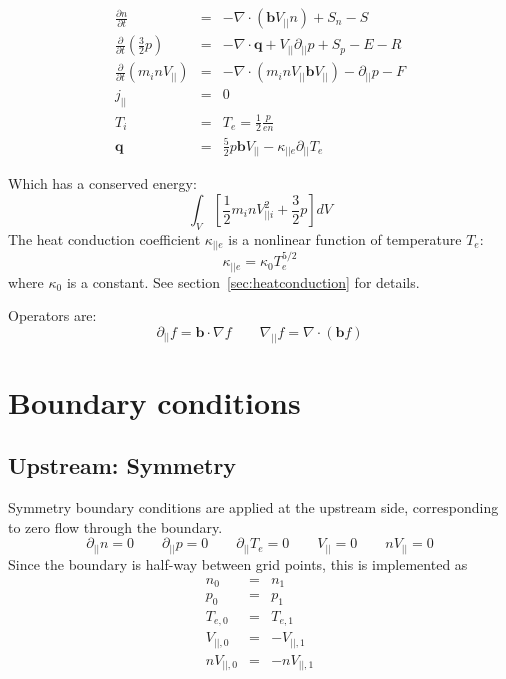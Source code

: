 \documentclass[12pt,a4paper]{article}
\newcommand{\bvec}{\mathbf{b}}
\begin{document}
\begin{eqnarray*}
  \frac{\partial n}{\partial t} &=& - \nabla\cdot\left( \bvec V_{||} n\right) + S_n - S\\
  \frac{\partial}{\partial t}\left(\frac{3}{2}p\right) &=& -\nabla\cdot\mathbf{q} + V_{||}\partial_{||}p + S_p - E - R \\
  \frac{\partial}{\partial t}\left(m_i nV_{||}\right) &=& -\nabla\cdot\left(m_inV_{||}\bvec V_{||}\right) - \partial_{||} p - F\\
  j_{||} &=& 0 \\
  T_i &=& T_e = \frac{1}{2}\frac{p}{en} \\
  \mathbf{q} &=& \frac{5}{2}p\bvec V_{||} - \kappa_{||e}\partial_{||}T_e
\end{eqnarray*}

Which has a conserved energy:
\[
\int_V \left[ \frac{1}{2}m_inV_{||i}^2 + \frac{3}{2}p \right] dV
\]
The heat conduction coefficient $\kappa_{||e}$ is a nonlinear function of temperature $T_e$:
\[
\kappa_{||e} = \kappa_0 T_e^{5/2}
\]
where $\kappa_0$ is a constant. See section~\ref{sec:heatconduction} for details.

Operators are:
\begin{equation}
\partial_{||}f = \mathbf{b}\cdot\nabla f \qquad \nabla_{||} f = \nabla\cdot\left(\mathbf{b} f\right)
\end{equation}



\section{Boundary conditions}


\subsection{Upstream: Symmetry}

Symmetry boundary conditions are applied at the upstream side, corresponding to zero flow through
the boundary.
\begin{equation}
  \partial_{||}n = 0 \qquad \partial_{||}p = 0 \qquad \partial_{||}T_e = 0 \qquad V_{||} = 0 \qquad nV_{||} = 0
\end{equation}
Since the boundary is half-way between grid points, this is implemented as
\begin{eqnarray*}
n_0 &=& n_1 \\
p_0 &=& p_1 \\
T_{e,0} &=& T_{e,1} \\
V_{||,0} &=& -V_{||,1} \\
nV_{||,0} &=& -nV_{||,1}
\end{eqnarray*}
\end{document}
